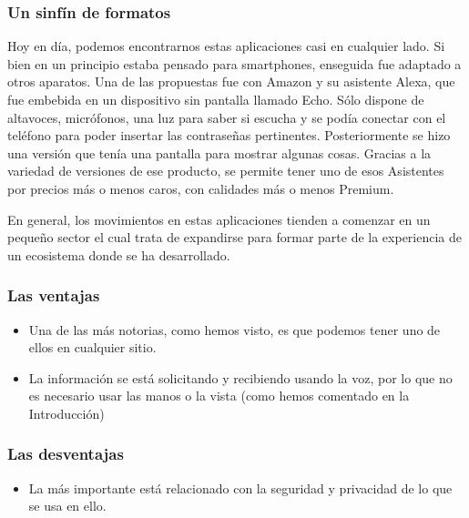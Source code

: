 \subsubsection{Un sinfín de formatos}
Hoy en día, podemos encontrarnos estas aplicaciones casi en cualquier lado. Si bien en un principio estaba pensado para smartphones, enseguida fue adaptado a otros aparatos.
Una de las propuestas fue con Amazon y su asistente Alexa, que fue embebida en un dispositivo sin pantalla llamado Echo. Sólo dispone de altavoces, micrófonos, una luz para saber si escucha y se podía conectar con el teléfono para poder insertar las contraseñas pertinentes. Posteriormente se hizo una versión que tenía una pantalla para mostrar algunas cosas.
Gracias a la variedad de versiones de ese producto, se permite tener uno de esos Asistentes por precios más o menos caros, con calidades más o menos Premium.

En general, los movimientos en estas aplicaciones tienden a comenzar en un pequeño sector el cual trata de expandirse para formar parte de la experiencia de un ecosistema donde se ha desarrollado.

\subsubsection{Las ventajas}
 \begin{itemize}
 	\item Una de las más notorias, como hemos visto, es que podemos tener uno de ellos en cualquier sitio.
 	\item La información se está solicitando y recibiendo usando la voz, por lo que no es necesario usar las manos o la vista (como hemos comentado en la Introducción)
 \end{itemize}
\subsubsection{Las desventajas}
	\begin{itemize}
		\item La más importante está relacionado con la seguridad y privacidad de lo que se usa en ello.
	\end{itemize}

